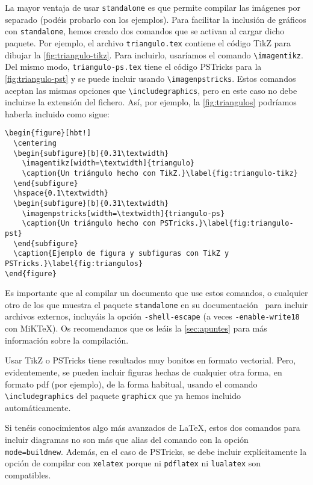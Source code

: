 \documentclass[bibtex]{TEMat-article}
\begin{document}
La mayor ventaja de usar \verb+standalone+ es que permite compilar las imágenes por separado (podéis probarlo con los ejemplos).
Para facilitar la inclusión de gráficos con \verb+standalone+, hemos creado dos comandos que se activan al cargar dicho paquete.
Por ejemplo, el archivo \verb+triangulo.tex+ contiene el código TikZ para dibujar la \cref{fig:triangulo-tikz}.
Para incluirlo, usaríamos el comando \verb+\imagentikz+.
Del mismo modo, \verb+triangulo-ps.tex+ tiene el código PSTricks para la \cref{fig:triangulo-pst} y se puede incluir usando \verb+\imagenpstricks+.
Estos comandos aceptan las mismas opciones que \verb+\includegraphics+, pero en este caso no debe incluirse la extensión del fichero.
Así, por ejemplo, la \cref{fig:triangulos} podríamos haberla incluido como sigue:
\begin{verbatim}
\begin{figure}[hbt!]
  \centering
  \begin{subfigure}[b]{0.31\textwidth}
    \imagentikz[width=\textwidth]{triangulo}
    \caption{Un triángulo hecho con TikZ.}\label{fig:triangulo-tikz}
  \end{subfigure}
  \hspace{0.1\textwidth}
  \begin{subfigure}[b]{0.31\textwidth}
    \imagenpstricks[width=\textwidth]{triangulo-ps}
    \caption{Un triángulo hecho con PSTricks.}\label{fig:triangulo-pst}
  \end{subfigure}
  \caption{Ejemplo de figura y subfiguras con TikZ y PSTricks.}\label{fig:triangulos}
\end{figure}
\end{verbatim}

Es importante que al compilar un documento que use estos comandos, o cualquier otro de los que muestra el paquete \verb+standalone+ en su documentación~\cite{standalone} para incluir archivos externos, incluyáis la opción \verb+-shell-escape+ (a veces \verb+-enable-write18+ con MiK\TeX).
Os recomendamos que os leáis la \cref{sec:apuntes} para más información sobre la compilación.

Usar TikZ o PSTricks tiene resultados muy bonitos en formato vectorial.
Pero, evidentemente, se pueden incluir figuras hechas de cualquier otra forma, en formato pdf (por ejemplo), de la forma habitual, usando el comando \verb+\includegraphics+ del paquete \verb+graphicx+ que ya hemos incluido automáticamente.

\begin{nota}
Si tenéis conocimientos algo más avanzados de \LaTeX{}, estos dos comandos para incluir diagramas no son más que alias del comando \verb++ con la opción \verb+mode=buildnew+.
Además, en el caso de PSTricks, se debe incluir explícitamente la opción de compilar con \verb+xelatex+ porque ni \verb+pdflatex+ ni \verb+lualatex+ son compatibles.
\end{nota}
\end{document}
